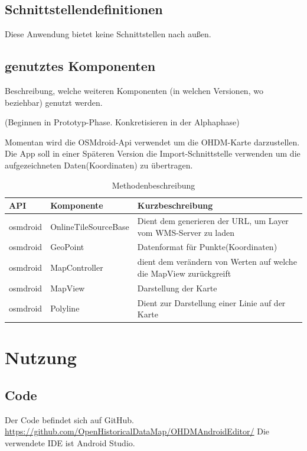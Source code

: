 \subsection{Schnittstellendefinitionen}

Diese Anwendung bietet keine Schnittstellen nach außen.

\subsection{genutztes Komponenten}
Beschreibung, welche weiteren Komponenten (in welchen Versionen, wo beziehbar) genutzt werden.

(Beginnen in Prototyp-Phase. Konkretisieren in der Alphaphase)

Momentan wird die OSMdroid-Api verwendet um die OHDM-Karte darzustellen.
Die App soll in einer Späteren Version die Import-Schnittstelle verwenden um die aufgezeichneten Daten(Koordinaten) zu übertragen.

\begin{table}[h]
 \begin{tabular}{|l|l|p{4cm}|}
 \hline
 API & Komponente & Kurzbeschreibung \\
 \hline
osmdroid & OnlineTileSourceBase & Dient dem generieren der URL, um Layer vom WMS-Server zu laden \newline 
 \\
 \hline
osmdroid & GeoPoint & Datenformat für Punkte(Koordinaten) \newline 
 \\
 \hline
osmdroid & MapController & dient dem verändern von Werten auf welche die MapView zurückgreift \newline 
 \\
 \hline
osmdroid & MapView & Darstellung der Karte \newline 
 \\
 \hline
osmdroid & Polyline & Dient zur Darstellung einer Linie auf der Karte \newline 
 \\
 \hline
 \end{tabular}
 \caption{Methodenbeschreibung}
 \end{table}


\section{Nutzung}
\subsection{Code}
Der Code befindet sich auf GitHub. \url{https://github.com/OpenHistoricalDataMap/OHDMAndroidEditor/}
Die verwendete IDE ist Android Studio.

